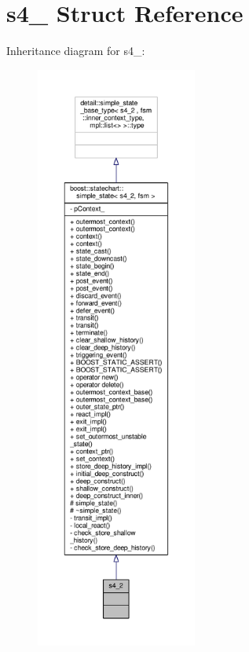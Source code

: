 \hypertarget{structs4__2}{}\section{s4\+\_ Struct Reference}
\label{structs4__2}


Inheritance diagram for s4\+\_\+:
\nopagebreak
\begin{figure}[H]
\begin{center}
\leavevmode
\includegraphics[height=550pt]{structs4__2__inherit__graph}
\end{center}
\end{figure}


